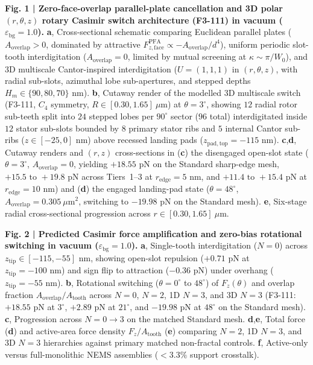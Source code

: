 \documentclass[11pt, a4paper]{article}
\begin{document}
\noindent\textbf{Fig. 1 | Zero-face-overlap parallel-plate cancellation and 3D polar $(r, \theta, z)$ rotary Casimir switch architecture (F3-111) in vacuum ($\varepsilon_{\mathrm{bg}}=1.0$).} \textbf{a}, Cross-sectional schematic comparing Euclidean parallel plates ($A_{\mathrm{overlap}} > 0$, dominated by attractive $F_{z,\mathrm{face}}^{\mathrm{PFA}} \propto -A_{\mathrm{overlap}}/d^4$), uniform periodic slot-tooth interdigitation ($A_{\mathrm{overlap}} = 0$, limited by mutual screening at $\kappa \sim \pi/W_0$), and 3D multiscale Cantor-inspired interdigitation ($U=(1,1,1)$ in $(r,\theta,z)$, with radial sub-slots, azimuthal lobe sub-apertures, and stepped depths $H_m \in \{90, 80, 70\}\text{ nm}$). \textbf{b}, Cutaway render of the modelled 3D multiscale switch (F3-111, $C_4$ symmetry, $R \in [0.30, 1.65]\ \mu\text{m}$) at $\theta = 3^\circ$, showing $12$ radial rotor sub-teeth split into $24$ stepped lobes per $90^\circ$ sector ($96$ total) interdigitated inside $12$ stator sub-slots bounded by $8$ primary stator ribs and $5$ internal Cantor sub-ribs ($z \in [-25, 0]\text{ nm}$) above recessed landing pads ($z_{\mathrm{pad,top}} = -115\text{ nm}$). \textbf{c},\textbf{d}, Cutaway renders and $(r,z)$ cross-sections in (\textbf{c}) the disengaged open-slot state ($\theta = 3^\circ$, $A_{\mathrm{overlap}} = 0$, yielding $+18.55\text{ pN}$ on the Standard sharp-edge mesh, $+15.5\text{ to }+19.8\text{ pN}$ across Tiers~1--3 at $r_{\mathrm{edge}}=5\text{ nm}$, and $+11.4\text{ to }+15.4\text{ pN}$ at $r_{\mathrm{edge}}=10\text{ nm}$) and (\textbf{d}) the engaged landing-pad state ($\theta = 48^\circ$, $A_{\mathrm{overlap}} = 0.305\ \mu\text{m}^2$, switching to $-19.98\text{ pN}$ on the Standard mesh). \textbf{e}, Six-stage radial cross-sectional progression across $r \in [0.30, 1.65]\ \mu\text{m}$.

\medskip
\noindent\textbf{Fig. 2 | Predicted Casimir force amplification and zero-bias rotational switching in vacuum ($\varepsilon_{\mathrm{bg}}=1.0$).} \textbf{a}, Single-tooth interdigitation ($N=0$) across $z_{\mathrm{tip}} \in [-115, -55]\text{ nm}$, showing open-slot repulsion ($+0.71\text{ pN}$ at $z_{\mathrm{tip}} = -100\text{ nm}$) and sign flip to attraction ($-0.36\text{ pN}$) under overhang ($z_{\mathrm{tip}} = -55\text{ nm}$). \textbf{b}, Rotational switching ($\theta = 0^\circ$ to $48^\circ$) of $F_z(\theta)$ and overlap fraction $A_{\mathrm{overlap}}/A_{\mathrm{tooth}}$ across $N=0$, $N=2$, 1D $N=3$, and 3D $N=3$ (F3-111: $+18.55\text{ pN}$ at $3^\circ$, $+2.89\text{ pN}$ at $21^\circ$, and $-19.98\text{ pN}$ at $48^\circ$ on the Standard mesh). \textbf{c}, Progression across $N = 0 \to 3$ on the matched Standard mesh. \textbf{d},\textbf{e}, Total force (\textbf{d}) and active-area force density $F_z/A_{\mathrm{tooth}}$ (\textbf{e}) comparing $N=2$, 1D $N=3$, and 3D $N=3$ hierarchies against primary matched non-fractal controls. \textbf{f}, Active-only versus full-monolithic NEMS assemblies ($<3.3\%$ support crosstalk).
\end{document}
